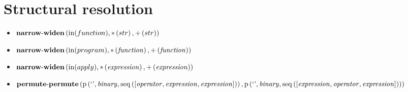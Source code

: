 \section{Structural resolution}
{\footnotesize\begin{itemize}
\item $\mathbf{narrow\text{-}widen}\left(\mathrm{in}(function),\\{*}\left(str\right),\\{+}\left(str\right)\right)$
\item $\mathbf{narrow\text{-}widen}\left(\mathrm{in}(program),\\{*}\left(\mathit{function}\right),\\{+}\left(\mathit{function}\right)\right)$
\item $\mathbf{narrow\text{-}widen}\left(\mathrm{in}(apply),\\{*}\left(\mathit{expression}\right),\\{+}\left(\mathit{expression}\right)\right)$
\item $\mathbf{permute\text{-}permute}\\\left(\mathrm{p}\left(\text{`'},\mathit{binary},\mathrm{seq}\left(\left[\mathit{operator}, \mathit{expression}, \mathit{expression}\right]\right)\right),\\\mathrm{p}\left(\text{`'},\mathit{binary},\mathrm{seq}\left(\left[\mathit{expression}, \mathit{operator}, \mathit{expression}\right]\right)\right)\right)$
\end{itemize}}
